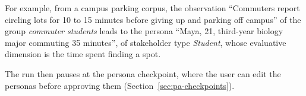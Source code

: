 For example, from a campus parking corpus, the observation ``Commuters report circling lots for 10 to 15 minutes before giving up and parking off campus'' of the group \emph{commuter students} leads to the persona ``Maya, 21, third-year biology major commuting 35 minutes'', of stakeholder type \emph{Student}, whose evaluative dimension is the time spent finding a spot.

The run then pauses at the persona checkpoint, where the user can edit the personas before approving them (Section~\ref{sec:pa-checkpoints}).
